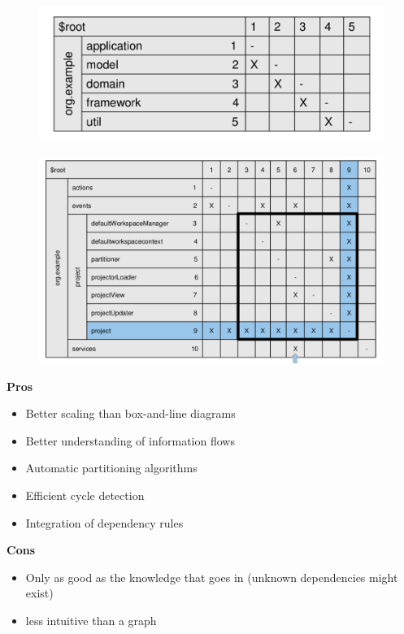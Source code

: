 \begin{figure}
  \centering
  \begin{minipage}{0.49\textwidth}
    \centering
    \includegraphics[width=\textwidth]{images/dsm_layered_pattern.png}
    \label{fig:dsm_layered_pattern}
  \end{minipage}%
  \begin{minipage}{0.49\textwidth}
    \centering
    \includegraphics[width=\textwidth]{images/dsm_propagator_anti_pattern}
    \label{fig:dsm_propagator_anti_pattern}
  \end{minipage}
\end{figure}

\begin{minipage}[t]{0.49\textwidth}
    \textbf{Pros}
    \begin{itemize}[topsep=0pt, itemsep=0pt]
      \item Better scaling than box-and-line diagrams
      \item Better understanding of information flows
      \item Automatic partitioning algorithms
      \item Efficient cycle detection
      \item Integration of dependency rules
    \end{itemize}
\end{minipage}
\begin{minipage}[t]{0.49\textwidth}
    \textbf{Cons}
    \begin{itemize}[topsep=0pt, itemsep=0pt]
      \item Only as good as the knowledge that goes in (unknown dependencies might exist)
      \item less intuitive than a graph
    \end{itemize}
\end{minipage}

